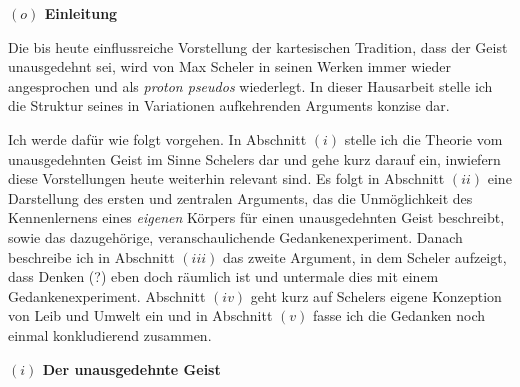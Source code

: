 \documentclass[a4paper, 12pt]{article}
\begin{document}
\begin{onehalfspace} 

\noindent\textbf{$(o)$ Einleitung}

\noindent Die bis heute einflussreiche Vorstellung der kartesischen Tradition, dass der Geist unausgedehnt sei, wird von Max Scheler in seinen Werken immer wieder angesprochen und als \emph{proton pseudos} wiederlegt. In dieser Hausarbeit stelle ich die Struktur seines in Variationen aufkehrenden Arguments konzise dar.  





Ich werde dafür wie folgt vorgehen. In Abschnitt $(i)$ stelle ich die Theorie vom unausgedehnten Geist im Sinne Schelers dar und gehe kurz darauf ein, inwiefern diese Vorstellungen heute weiterhin relevant sind. Es folgt in Abschnitt $(ii)$ eine Darstellung des ersten und zentralen Arguments, das die Unmöglichkeit des Kennenlernens eines \emph{eigenen} Körpers für einen unausgedehnten Geist beschreibt, sowie das dazugehörige, veranschaulichende Gedankenexperiment. Danach beschreibe ich in Abschnitt $(iii)$ das zweite Argument, in dem Scheler aufzeigt, dass Denken (?) eben doch räumlich ist und untermale dies mit einem Gedankenexperiment. Abschnitt $(iv)$ geht kurz auf Schelers eigene Konzeption von Leib und Umwelt ein und in Abschnitt $(v)$ fasse ich die Gedanken noch einmal konkludierend zusammen. %

\vspace{5mm}
\noindent\textbf{$(i)$ Der unausgedehnte Geist}




\end{onehalfspace}
\end{document}
